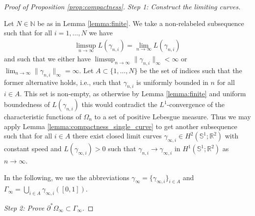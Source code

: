 \documentclass[11pt]{article}
\numberwithin{statement}{section}
\numberwithin{equation}{section}
\theoremstyle{remark}
\newcommand{\R}{\mathbb R} 				%
\newcommand{\N}{\mathbb N}
\newcommand{\Sph}{{\mathbb S}}				%
\begin{document}
\begin{proof}[Proof of Proposition \ref{prop:compactness}]
\textit{Step 1: Construct the limiting curves.}

Let $N \in \N$ be as in Lemma \ref{lemma:finite}.  We take a
non-relabeled subsequence such that for all $i =1,\ldots, N$ we have
\begin{align}
	\limsup_{n \to \infty} L( \gamma_{n,i}) =
\lim_{n \to \infty} L( \gamma_{n,i})
\end{align}
and such that we either have
$\limsup_{n \to \infty} \| \gamma_{n,i}\|_\infty < \infty$ or
$\lim_{n \to \infty} \| \gamma_{n,i}\|_\infty = \infty$.  Let
$A \subset \{1,\ldots , N\}$ be the set of indices such that the
former alternative holds, i.e., such that $\gamma_{n,i}$ is uniformly
bounded in $n$ for all $i \in A$. This set is non-empty, as otherwise
by Lemma \ref{lemma:finite} and uniform boundedness of
  $L(\gamma_{n,i})$ this would contradict the $L^1$-convergence of
the characteristic functions of $\Omega_n$ to a set of positive
Lebesgue measure.
Thus we may apply Lemma \ref{lemma:compactness_single_curve} to get
another subsequence such that for all $i \in A$ there exist closed
limit curves $ \gamma_{\infty,i} \in H^2(\Sph^1;\R^2)$ with
constant speed and $L( \gamma_{\infty,i}) >0$ such that
$ \gamma_{n,i} \to \gamma_{\infty,i}$ in $H^1(\Sph^1; \R^2)$ as
$n \to \infty$.  

\medskip

In the following, we use the abbreviations
$\gamma_\infty = \{ \gamma_{\infty,i} \}_{i \in A}$ and
$\Gamma_\infty = \bigcup_{i \in A} \gamma_{\infty,i}([0,1])$. \medskip

\textit{Step 2: Prove $\partial^* \Omega_\infty \subset \Gamma_\infty$.}


\end{proof}
\end{document}
